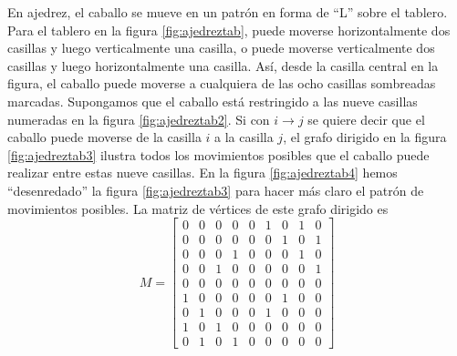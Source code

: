 \begin{example}
\begin{nscenter}
    \end{nscenter}
\end{example}

\begin{example}
    En ajedrez, el caballo se mueve en un patrón en forma de “L” sobre el tablero. Para el tablero en la figura \ref{fig:ajedreztab}, puede moverse horizontalmente dos casillas y luego verticalmente una casilla, o puede moverse verticalmente dos casillas y luego horizontalmente una casilla. Así, desde la casilla central en la figura, el caballo puede moverse a cualquiera de las ocho casillas sombreadas marcadas. Supongamos que el caballo está restringido a las nueve casillas numeradas en la figura \ref{fig:ajedreztab2}. Si con $i \to j$ se quiere decir que el caballo puede moverse de la casilla $i$ a la casilla $j$, el grafo dirigido en la figura \ref{fig:ajedreztab3} ilustra todos los movimientos posibles que el caballo puede realizar entre estas nueve casillas. En la figura \ref{fig:ajedreztab4} hemos “desenredado” la figura \ref{fig:ajedreztab3} para hacer más claro el patrón de movimientos posibles. La matriz de vértices de este grafo dirigido es
    $$M = \begin{bmatrix}
        0 & 0 & 0 & 0 & 0 & 1 & 0 & 1 & 0 \\
        0 & 0 & 0 & 0 & 0 & 0 & 1 & 0 & 1 \\
        0 & 0 & 0 & 1 & 0 & 0 & 0 & 1 & 0 \\
        0 & 0 & 1 & 0 & 0 & 0 & 0 & 0 & 1 \\
        0 & 0 & 0 & 0 & 0 & 0 & 0 & 0 & 0 \\
        1 & 0 & 0 & 0 & 0 & 0 & 1 & 0 & 0 \\
        0 & 1 & 0 & 0 & 0 & 1 & 0 & 0 & 0 \\
        1 & 0 & 1 & 0 & 0 & 0 & 0 & 0 & 0 \\
        0 & 1 & 0 & 1 & 0 & 0 & 0 & 0 & 0 
    \end{bmatrix}$$
\end{example}

